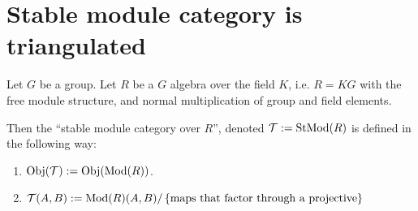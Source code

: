 \section{Stable module category is triangulated}

\begin{definition}\label{def:stable_module_category}
    Let \( G \) be a group. Let \( R \) be a \( G \) algebra over the field \( K \), i.e. \( R = KG \) with the free module structure, and normal multiplication of group and field elements.

    Then the ``stable module category over \( R \)'', denoted \( {\mathcal{T}} := \operatorname{StMod}(R) \) is defined in the following way:
    \begin{enumerate}
        \item \( \operatorname{Obj}({\mathcal{T}}) := \operatorname{Obj}(\operatorname{Mod}(R)) \).
        \item \( {\mathcal{T}}(A, B) := \operatorname{Mod}(R)(A, B)/\left\{\text{maps that factor through a projective}\right\} \)
    \end{enumerate}
\end{definition}

